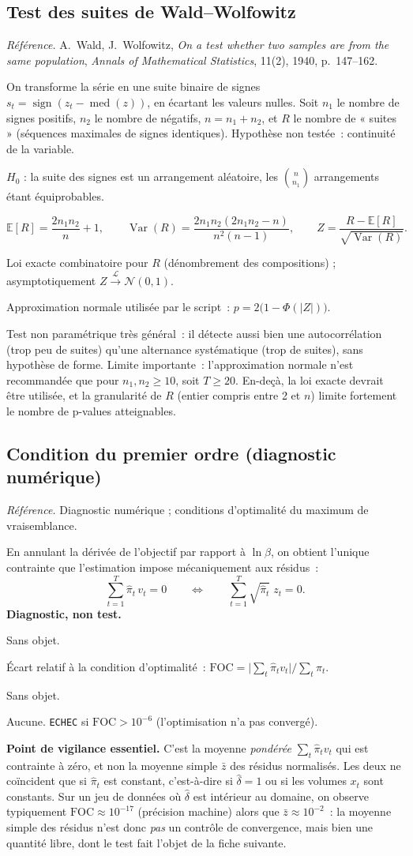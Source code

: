 \documentclass[a4paper,11pt]{article}
\newcommand{\code}[1]{\texttt{\small #1}}
\newcommand{\refl}[1]{{\small\textcolor{maincolor!70!black}{\textit{Référence.} #1}}\par\smallskip}
\newcounter{ficheid}
\newenvironment{fiche}[1]{%
  \stepcounter{ficheid}%
  \phantomsection
  \subsection{#1}%
  \label{fiche:\theficheid}%
}{%
  \end{description}\vspace{0.5em}%
}
\newcommand{\Cadre}{%
  \begin{description}[leftmargin=0pt, style=unboxed, itemsep=3pt, topsep=3pt, parsep=2pt]%
  \item[\textcolor{financeblue}{\textbf{1. Cadre, notations et hypothèses de validité (non testées).}}]}
\newcommand{\Hzero}{\item[\textcolor{financeblue}{\textbf{2. Hypothèse nulle.}}]}
\newcommand{\Stat}{\item[\textcolor{financeblue}{\textbf{3. Statistique de test.}}]}
\newcommand{\Loi}{\item[\textcolor{financeblue}{\textbf{4. Loi sous $H_0$.}}]}
\newcommand{\Pval}{\item[\textcolor{financeblue}{\textbf{5. p-value.}}]}
\newcommand{\Usage}{\item[\textcolor{financeblue}{\textbf{6. Usage et limites.}}]}
\begin{document}
\begin{fiche}{Test des suites de Wald--Wolfowitz}
\refl{A.~Wald, J.~Wolfowitz, \emph{On a test whether two samples are from the same population},
\emph{Annals of Mathematical Statistics}, 11(2), 1940, p.~147--162.}
\Cadre
On transforme la série en une suite binaire de signes
$s_t = \operatorname{sign}(z_t - \operatorname{med}(z))$, en écartant les valeurs nulles. Soit
$n_1$ le nombre de signes positifs, $n_2$ le nombre de négatifs, $n = n_1+n_2$, et $R$ le nombre
de « suites » (séquences maximales de signes identiques). Hypothèse non testée~: continuité de la
variable.
\Hzero
$H_0$ : la suite des signes est un arrangement aléatoire, les $\binom{n}{n_1}$ arrangements étant
équiprobables.
\Stat
\[
  \mathbb{E}[R] = \frac{2n_1n_2}{n} + 1,
  \qquad
  \operatorname{Var}(R) = \frac{2n_1n_2(2n_1n_2 - n)}{n^2(n-1)},
  \qquad
  Z = \frac{R - \mathbb{E}[R]}{\sqrt{\operatorname{Var}(R)}} .
\]
\Loi
Loi exacte combinatoire pour $R$ (dénombrement des compositions) ; asymptotiquement
$Z \xrightarrow{\ \mathcal{L}\ } \mathcal{N}(0,1)$.
\Pval
Approximation normale utilisée par le script~: $p = 2\big(1 - \Phi(|Z|)\big)$.
\Usage
Test non paramétrique très général~: il détecte aussi bien une autocorrélation (trop peu de
suites) qu'une alternance systématique (trop de suites), sans hypothèse de forme. Limite
importante~: l'approximation normale n'est recommandée que pour $n_1, n_2 \ge 10$, soit
$T \ge 20$. En-deçà, la loi exacte devrait être utilisée, et la granularité de $R$ (entier compris
entre 2 et $n$) limite fortement le nombre de p-values atteignables.
\end{fiche}

\begin{fiche}{Condition du premier ordre (diagnostic numérique)}
\refl{Diagnostic numérique ; conditions d'optimalité du maximum de vraisemblance.}
\Cadre
En annulant la dérivée de l'objectif par rapport à $\ln\beta$, on obtient l'unique contrainte
que l'estimation impose mécaniquement aux résidus~:
\[
  \sum_{t=1}^{T} \hat\pi_t\, v_t = 0
  \qquad\Longleftrightarrow\qquad
  \sum_{t=1}^{T} \sqrt{\hat\pi_t}\; z_t = 0 .
\]
\textbf{Diagnostic, non test.}
\Hzero
Sans objet.
\Stat
Écart relatif à la condition d'optimalité~:
$\displaystyle \mathrm{FOC} = \Big|\sum_t \hat\pi_t v_t\Big| \Big/ \sum_t \hat\pi_t$.
\Loi
Sans objet.
\Pval
Aucune. \code{ECHEC} si $\mathrm{FOC} > 10^{-6}$ (l'optimisation n'a pas convergé).
\Usage
\textbf{Point de vigilance essentiel.} C'est la moyenne \emph{pondérée} $\sum_t\hat\pi_t v_t$ qui
est contrainte à zéro, et non la moyenne simple $\bar z$ des résidus normalisés. Les deux ne
coïncident que si $\hat\pi_t$ est constant, c'est-à-dire si $\hat\delta = 1$ ou si les volumes
$x_t$ sont constants. Sur un jeu de données où $\hat\delta$ est intérieur au domaine, on observe
typiquement $\mathrm{FOC} \approx 10^{-17}$ (précision machine) alors que
$\bar z \approx 10^{-2}$~: la moyenne simple des résidus n'est donc \emph{pas} un contrôle de
convergence, mais bien une quantité libre, dont le test fait l'objet de la fiche suivante.
\end{fiche}
\end{document}
